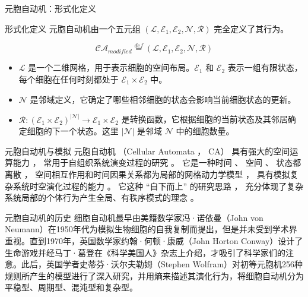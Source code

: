 \documentclass{beamer}
\begin{document}
\begin{frame}{元胞自动机：形式化定义}
    
    \begin{block}{形式化定义}
        元胞自动机由一个五元组 $({\displaystyle {\mathcal {L}}}, {\displaystyle {\mathcal {E}}}_1, {\displaystyle {\mathcal {E}}}_2, {\displaystyle {\mathcal {N}}}, {\displaystyle {\mathcal {R}}})$ 完全定义了其行为。
        
        \[
            {\displaystyle {\mathcal {CA}}}_{modified} \overset{def}{=} ({\displaystyle {\mathcal {L}}}, {\displaystyle {\mathcal {E}}}_1, {\displaystyle {\mathcal {E}}}_2, {\displaystyle {\mathcal {N}}}, {\displaystyle {\mathcal {R}}})
        \]
    \end{block}
    
   \begin{itemize}
        \item ${\displaystyle {\mathcal {L}}}$ 是一个二维网格，用于表示细胞的空间布局。${\displaystyle {\mathcal {E}}}_1$ 和 ${\displaystyle {\mathcal {E}}}_2$ 表示一组有限状态，每个细胞在任何时刻都处于 ${\displaystyle {\mathcal {E}}}_1 \times {\displaystyle {\mathcal {E}}}_2 $ 中。
        \item ${\displaystyle {\mathcal {N}}}$ 是邻域定义，它确定了哪些相邻细胞的状态会影响当前细胞状态的更新。
        \item ${\displaystyle {\mathcal {R}}}: ({\displaystyle {\mathcal {E}}}_1 \times {\displaystyle {\mathcal {E}}}_2 )^{\left|{\displaystyle {\mathcal {N}}}\right|} \rightarrow {\displaystyle {\mathcal {E}}}_1 \times {\displaystyle {\mathcal {E}}}_2 $ 是转换函数，它根据细胞的当前状态及其邻居确定细胞的下一个状态。这里 $\left|{\displaystyle {\mathcal {N}}}\right|$ 是邻域 ${\displaystyle {\mathcal {N}}}$ 中的细胞数量。
\end{itemize}
    
\end{frame}


\begin{frame}{元胞自动机与模拟}
    \hspace{2em} 元胞自动机 （Cellular Automata ， CA） 具有强大的空间运算能力 ， 常用于自组织系统演变过程的研究 。 它是一种时间 、 空间 、 状态都离散 ， 空间相互作用和时间因果关系都为局部的网格动力学模型 ， 具有模拟复杂系统时空演化过程的能力 。 它这种 “自下而上” 的研究思路 ， 充分体现了复杂系统局部的个体行为产生全局、有秩序模式的理念 。 

\end{frame}


\begin{frame}{元胞自动机的历史}
    \hspace{2em} 细胞自动机最早由美籍数学家冯·诺依曼（John von Neumann）在1950年代为模拟生物细胞的自我复制而提出，但是并未受到学术界重视。直到1970年，英国数学家约翰·何顿·康威（John Horton Conway）设计了生命游戏并经马丁·葛登在《科学美国人》杂志上介绍，才吸引了科学家们的注意。此后，英国学者史蒂芬·沃尔夫勒姆（Stephen Wolfram）对初等元胞机256种规则所产生的模型进行了深入研究，并用熵来描述其演化行为，将细胞自动机分为平稳型、周期型、混沌型和复杂型。
\end{frame}
\end{document}
